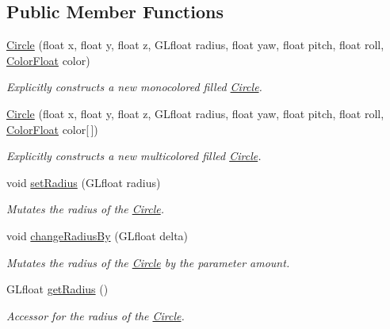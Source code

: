 \subsection*{Public Member Functions}
\begin{DoxyCompactItemize}
\item 
\hyperlink{classtsgl_1_1_circle_aed06fe2620b6fc81ecc3d6ed94e47aeb}{Circle} (float x, float y, float z, G\+Lfloat radius, float yaw, float pitch, float roll, \hyperlink{structtsgl_1_1_color_float}{Color\+Float} color)
\begin{DoxyCompactList}\small\item\em Explicitly constructs a new monocolored filled \hyperlink{classtsgl_1_1_circle}{Circle}. \end{DoxyCompactList}\item 
\hyperlink{classtsgl_1_1_circle_aeee2a7388c304fd8deb601d426dc0211}{Circle} (float x, float y, float z, G\+Lfloat radius, float yaw, float pitch, float roll, \hyperlink{structtsgl_1_1_color_float}{Color\+Float} color\mbox{[}$\,$\mbox{]})
\begin{DoxyCompactList}\small\item\em Explicitly constructs a new multicolored filled \hyperlink{classtsgl_1_1_circle}{Circle}. \end{DoxyCompactList}\item 
void \hyperlink{classtsgl_1_1_circle_a515710a6bbec274a1b8686c0d427a0d5}{set\+Radius} (G\+Lfloat radius)
\begin{DoxyCompactList}\small\item\em Mutates the radius of the \hyperlink{classtsgl_1_1_circle}{Circle}. \end{DoxyCompactList}\item 
void \hyperlink{classtsgl_1_1_circle_a1778df77ca0903a9a4d3060b10ff7925}{change\+Radius\+By} (G\+Lfloat delta)
\begin{DoxyCompactList}\small\item\em Mutates the radius of the \hyperlink{classtsgl_1_1_circle}{Circle} by the parameter amount. \end{DoxyCompactList}\item 
G\+Lfloat \hyperlink{classtsgl_1_1_circle_ab6b2d16691b472d04972b1860856e7dd}{get\+Radius} ()
\begin{DoxyCompactList}\small\item\em Accessor for the radius of the \hyperlink{classtsgl_1_1_circle}{Circle}. \end{DoxyCompactList}\item 

\end{DoxyCompactItemize}
